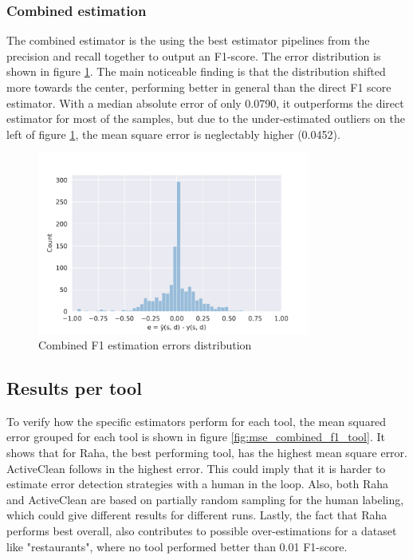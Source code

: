 \subsubsection{Combined estimation}
The combined estimator is the using the best estimator pipelines from the precision and recall together to output an F1-score. The error distribution is shown in figure \ref{fig:combined_f1_estimation_errors}. The main noticeable finding is that the distribution shifted more towards the center, performing better in general than the direct F1 score estimator. With a median absolute error of only 0.0790, it outperforms the direct estimator for most of the samples, but due to the under-estimated outliers on the left of figure \ref{fig:combined_f1_estimation_errors}, the mean square error is neglectably higher (0.0452). 

\begin{figure}
    \centering
    \includegraphics[width=0.8\textwidth]{thesis/Figures/RQ2/15_error_histogramcell_f1_combined.pdf}
    \caption{Combined F1 estimation errors distribution}
    \label{fig:combined_f1_estimation_errors}
\end{figure}

\subsection{Results per tool}
To verify how the specific estimators perform for each tool, the mean squared error grouped for each tool is shown in figure \ref{fig:mse_combined_f1_tool}. It shows that for Raha, the best performing tool, has the highest mean square error. ActiveClean follows in the highest error. This could imply that it is harder to estimate error detection strategies with a human in the loop. Also, both Raha and ActiveClean are based on partially random sampling for the human labeling, which could give different results for different runs. Lastly, the fact that Raha performs best overall, also contributes to possible over-estimations for a dataset like "restaurants", where no tool performed better than 0.01 F1-score. 

